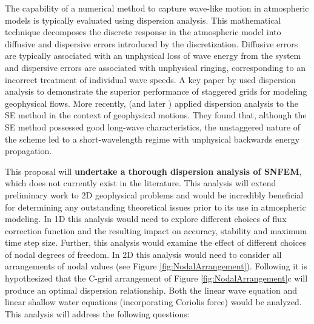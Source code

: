\documentclass[11pt]{article}
\begin{document}
The capability of a numerical method to capture wave-like motion in atmospheric models is typically evaluated using dispersion analysis.  This mathematical technique decomposes the discrete response in the atmospheric model into diffusive and dispersive errors introduced by the discretization.  Diffusive errors are typically associated with an unphysical loss of wave energy from the system and dispersive errors are associated with unphysical ringing, corresponding to an incorrect treatment of individual wave speeds.  A key paper by \cite{randall1994geostrophic} used dispersion analysis to demonstrate the superior performance of staggered grids for modeling geophysical flows.  More recently, \cite{MAHAW2009SIAMJNA} (and later \cite{melvin2012dispersion}) applied dispersion analysis to the SE method in the context of geophysical motions.  They found that, although the SE method possessed good long-wave characteristics, the unstaggered nature of the scheme led to a short-wavelength regime with unphysical backwards energy propagation.

This proposal will \textbf{undertake a thorough dispersion analysis of SNFEM}, which does not currently exist in the literature.  This analysis will extend preliminary work to 2D geophysical problems and would be incredibly beneficial for determining any outstanding theoretical issues prior to its use in atmospheric modeling.  In 1D this analysis would need to explore different choices of flux correction function \cite{huynh2007flux} and the resulting impact on accuracy, stability and maximum time step size.  Further, this analysis would examine the effect of different choices of nodal degrees of freedom.  In 2D this analysis would need to consider all arrangements of nodal values (see Figure \ref{fig:NodalArrangement}).  Following \cite{randall1994geostrophic} it is hypothesized that the C-grid arrangement of Figure \ref{fig:NodalArrangement}c will produce an optimal dispersion relationship.  Both the linear wave equation and linear shallow water equations (incorporating Coriolis force) would be analyzed.  This analysis will address the following questions:

\end{document}
